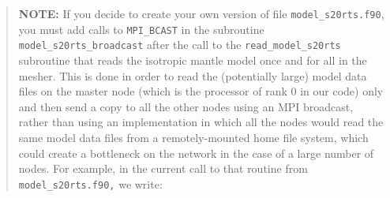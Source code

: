 \documentclass[oneside,english]{book}
\begin{document}
\begin{quote}
\textbf{NOTE:} If you decide to create your own version of file \texttt{model\_s20rts.f90},
you must add calls to \texttt{MPI\_BCAST} in the subroutine \texttt{model\_s20rts\_broadcast}
after the call to the \texttt{read\_model\_s20rts} subroutine that
reads the isotropic mantle model once and for all in the mesher. This
is done in order to read the (potentially large) model data files
on the master node (which is the processor of rank 0 in our code)
only and then send a copy to all the other nodes using an MPI broadcast,
rather than using an implementation in which all the nodes would read
the same model data files from a remotely-mounted home file system,
which could create a bottleneck on the network in the case of a large
number of nodes. For example, in the current call to that routine
from \texttt{model\_s20rts.f90,} we write:
\end{quote}
\end{document}
